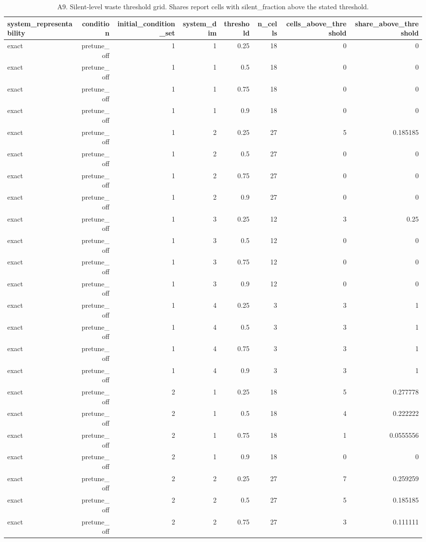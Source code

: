 \begin{table}[htbp]
\centering
\caption{A9. Silent-level waste threshold grid. Shares report cells with silent\_fraction above the stated threshold.}
\begin{tabular}{lrrrrrrr}
\toprule
system\_representability & condition & initial\_condition\_set & system\_dim & threshold & n\_cells & cells\_above\_threshold & share\_above\_threshold \\
\midrule
exact & pretune\_off & 1 & 1 & 0.25 & 18 & 0 & 0 \\
exact & pretune\_off & 1 & 1 & 0.5 & 18 & 0 & 0 \\
exact & pretune\_off & 1 & 1 & 0.75 & 18 & 0 & 0 \\
exact & pretune\_off & 1 & 1 & 0.9 & 18 & 0 & 0 \\
exact & pretune\_off & 1 & 2 & 0.25 & 27 & 5 & 0.185185 \\
exact & pretune\_off & 1 & 2 & 0.5 & 27 & 0 & 0 \\
exact & pretune\_off & 1 & 2 & 0.75 & 27 & 0 & 0 \\
exact & pretune\_off & 1 & 2 & 0.9 & 27 & 0 & 0 \\
exact & pretune\_off & 1 & 3 & 0.25 & 12 & 3 & 0.25 \\
exact & pretune\_off & 1 & 3 & 0.5 & 12 & 0 & 0 \\
exact & pretune\_off & 1 & 3 & 0.75 & 12 & 0 & 0 \\
exact & pretune\_off & 1 & 3 & 0.9 & 12 & 0 & 0 \\
exact & pretune\_off & 1 & 4 & 0.25 & 3 & 3 & 1 \\
exact & pretune\_off & 1 & 4 & 0.5 & 3 & 3 & 1 \\
exact & pretune\_off & 1 & 4 & 0.75 & 3 & 3 & 1 \\
exact & pretune\_off & 1 & 4 & 0.9 & 3 & 3 & 1 \\
exact & pretune\_off & 2 & 1 & 0.25 & 18 & 5 & 0.277778 \\
exact & pretune\_off & 2 & 1 & 0.5 & 18 & 4 & 0.222222 \\
exact & pretune\_off & 2 & 1 & 0.75 & 18 & 1 & 0.0555556 \\
exact & pretune\_off & 2 & 1 & 0.9 & 18 & 0 & 0 \\
exact & pretune\_off & 2 & 2 & 0.25 & 27 & 7 & 0.259259 \\
exact & pretune\_off & 2 & 2 & 0.5 & 27 & 5 & 0.185185 \\
exact & pretune\_off & 2 & 2 & 0.75 & 27 & 3 & 0.111111 \\

\end{tabular}
\end{table}

